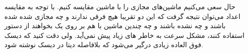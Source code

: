 حال سعی می‌کنیم ماشین‌های مجازی را با ماشین
مقایسه کنیم. با توجه به مقایسه اعداد می‌توان نتیجه گرفت که این دو تقریبا هیچ فرقی ندارند
و چه مجازی شده شده باشند و چه نشده باشند و چه چندین ماشین با هم بر روی یک
بخواهند از دستور
استفاده کنند، مشکل سرعت به خاطر
های
زیاد پیش نمی‌آید. ولی دقت کنید که دیسک فوق العاده زیادی درگیر می‌شود که بلافاصله دیتا در دیسک
نوشته شود.

